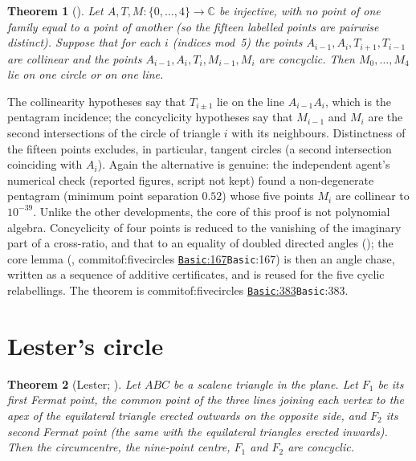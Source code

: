 \documentclass[11pt]{article}
\newtheorem{theorem}{Theorem}
\theoremstyle{definition}
\theoremstyle{remark}
\newcommand{\CC}{\mathbb{C}}
\newcommand{\commitof}[1]{\csname commitof:#1\endcsname}
\newcommand{\repo}[1]{https://github.com/jpbald93/#1}
\newcommand{\src}[4]{\ifcsname commitof:#1\endcsname
  \href{\repo{#1}/blob/\commitof{#1}/#2/#3.lean\#L#4}{\texttt{#3}:#4}\else\texttt{#3}:#4\fi}
\begin{document}
\begin{theorem}[]\label{thm:five}
Let $A,T,M:\{0,\dots,4\}\to\CC$ be injective, with no point of one family equal to a point of
another (so the fifteen labelled points are pairwise distinct). Suppose that for each $i$ (indices mod~5) the points $A_{i-1},A_i,T_{i+1},T_{i-1}$ are
collinear and the points $A_{i-1},A_i,T_i,M_{i-1},M_i$ are concyclic. Then $M_0,\dots,M_4$ lie on one
circle or on one line.
\end{theorem}

The collinearity hypotheses say that $T_{i\pm1}$ lie on the line $A_{i-1}A_i$, which is the
pentagram incidence; the concyclicity hypotheses say that $M_{i-1}$ and $M_i$ are the second
intersections of the circle of triangle $i$ with its neighbours. Distinctness of the fifteen points
excludes, in particular, tangent circles (a second intersection coinciding with $A_i$). Again the
alternative is genuine: the independent agent's numerical check (reported figures, script not kept) found a non-degenerate pentagram (minimum point
separation $0.52$) whose five points $M_i$ are collinear to $10^{-39}$. Unlike the other developments,
the core of this proof is not polynomial algebra. Concyclicity of four points is reduced to the
vanishing of the imaginary part of a cross-ratio, and that to an equality of doubled directed angles
(); the core lemma (, \src{fivecircles}{Fivecircles}{Basic}{167})
is then an angle chase, written as a sequence of additive certificates, and is reused for the five
cyclic relabellings. The theorem is \src{fivecircles}{Fivecircles}{Basic}{383}.

\section{Lester's circle}\label{sec:lester}

\begin{theorem}[Lester; ]\label{thm:lester}
Let $ABC$ be a scalene triangle in the plane. Let $F_1$ be its first Fermat point, the common point of
the three lines joining each vertex to the apex of the equilateral triangle erected outwards on the
opposite side, and $F_2$ its second Fermat point (the same with the equilateral triangles erected
inwards). Then the circumcentre, the nine-point centre, $F_1$ and $F_2$ are concyclic.
\end{theorem}
\end{document}
